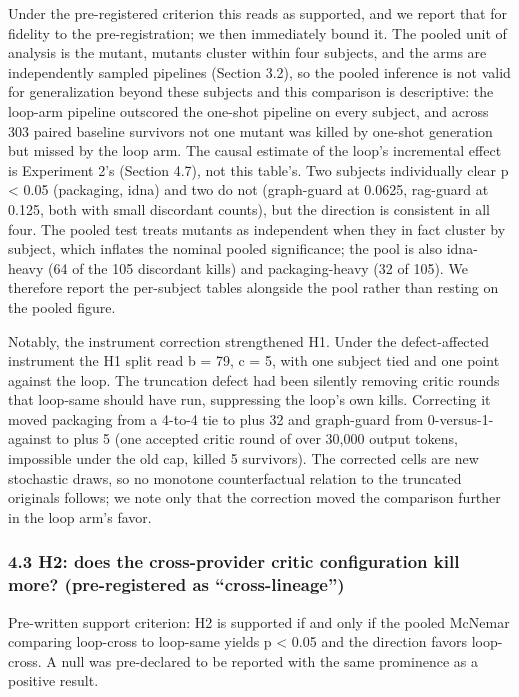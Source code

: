 \documentclass[
  11pt,
]{article}
\begin{document}
Under the pre-registered criterion this reads as supported, and we
report that for fidelity to the pre-registration; we then immediately
bound it. The pooled unit of analysis is the mutant, mutants cluster
within four subjects, and the arms are independently sampled pipelines
(Section 3.2), so the pooled inference is not valid for generalization
beyond these subjects and this comparison is descriptive: the loop-arm
pipeline outscored the one-shot pipeline on every subject, and across
303 paired baseline survivors not one mutant was killed by one-shot
generation but missed by the loop arm. The causal estimate of the loop's
incremental effect is Experiment 2's (Section 4.7), not this table's.
Two subjects individually clear p \textless{} 0.05 (packaging, idna) and
two do not (graph-guard at 0.0625, rag-guard at 0.125, both with small
discordant counts), but the direction is consistent in all four. The
pooled test treats mutants as independent when they in fact cluster by
subject, which inflates the nominal pooled significance; the pool is
also idna-heavy (64 of the 105 discordant kills) and packaging-heavy (32
of 105). We therefore report the per-subject tables alongside the pool
rather than resting on the pooled figure.

Notably, the instrument correction strengthened H1. Under the
defect-affected instrument the H1 split read b = 79, c = 5, with one
subject tied and one point against the loop. The truncation defect had
been silently removing critic rounds that loop-same should have run,
suppressing the loop's own kills. Correcting it moved packaging from a
4-to-4 tie to plus 32 and graph-guard from 0-versus-1-against to plus 5
(one accepted critic round of over 30,000 output tokens, impossible
under the old cap, killed 5 survivors). The corrected cells are new
stochastic draws, so no monotone counterfactual relation to the
truncated originals follows; we note only that the correction moved the
comparison further in the loop arm's favor.

\subsubsection{4.3 H2: does the cross-provider critic configuration kill
more? (pre-registered as
``cross-lineage'')}\label{h2-does-the-cross-provider-critic-configuration-kill-more-pre-registered-as-cross-lineage}

Pre-written support criterion: H2 is supported if and only if the pooled
McNemar comparing loop-cross to loop-same yields p \textless{} 0.05 and
the direction favors loop-cross. A null was pre-declared to be reported
with the same prominence as a positive result.
\end{document}
